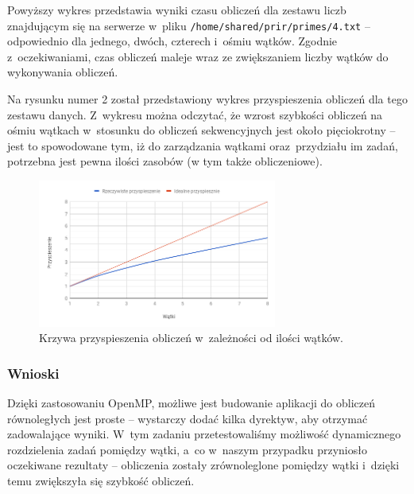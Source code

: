 \documentclass[a4paper,12pt]{article}
\begin{document}
Powyższy wykres przedstawia wyniki czasu obliczeń dla zestawu liczb znajdującym się na serwerze w~pliku \texttt{/home/shared/prir/primes/4.txt} -- odpowiednio dla jednego, dwóch, czterech i~ośmiu wątków. Zgodnie z~oczekiwaniami, czas obliczeń maleje wraz ze zwiększaniem liczby wątków do wykonywania obliczeń.

Na rysunku numer 2 został przedstawiony wykres przyspieszenia obliczeń dla tego zestawu danych. Z~wykresu można odczytać, że wzrost szybkości obliczeń na ośmiu wątkach w~stosunku do obliczeń sekwencyjnych jest około pięciokrotny -- jest to spowodowane tym, iż do zarządzania wątkami oraz~przydziału im zadań, potrzebna jest pewna ilości zasobów (w tym także obliczeniowe).

\begin{figure}[!htbp]
  \centering
    \includegraphics[width=0.7\textwidth]{chart2}
    \caption{Krzywa przyspieszenia obliczeń w~zależności od ilości wątków.}
  \label{chart-acceleration}
\end{figure}

\subsubsection*{Wnioski}
Dzięki zastosowaniu OpenMP, możliwe jest budowanie aplikacji do obliczeń równoległych jest proste -- wystarczy dodać kilka dyrektyw, aby otrzymać zadowalające wyniki. W~tym zadaniu przetestowaliśmy możliwość dynamicznego rozdzielenia zadań pomiędzy wątki, a~co w~naszym przypadku przyniosło oczekiwane rezultaty -- obliczenia zostały zrównoleglone pomiędzy wątki i~dzięki temu zwiększyła się szybkość obliczeń.
\end{document}
